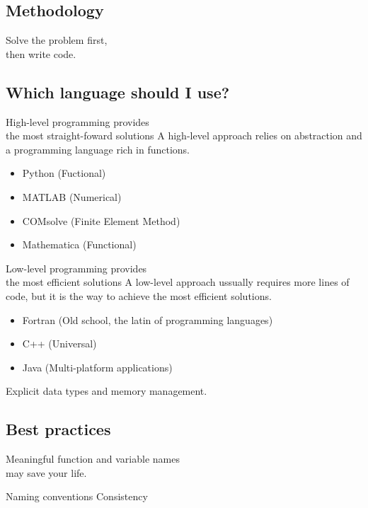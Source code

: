 \documentclass[xcolor={dvipsnames}]{beamer}
\begin{document}
\subsection{Methodology}

\begin{frame}{Solve the problem first,\\ then write code.}{}

\end{frame}

\subsection{Which language should I use?}

\begin{frame}{High-level programming provides\\ the most straight-foward solutions}{}
A high-level approach relies on abstraction and a programming language rich in functions.

\bigskip
\begin{itemize}
\item Python (Fuctional)
\item MATLAB (Numerical)
\item COMsolve (Finite Element Method)
\item Mathematica (Functional)
\end{itemize}
\end{frame}

\begin{frame}{Low-level programming provides\\ the most efficient solutions}{}
A low-level approach ussually requires more lines of code, but it is the way to achieve the most efficient solutions.

\bigskip
\begin{itemize}
\item Fortran (Old school, the latin of programming languages)
\item C++ (Universal)
\item Java (Multi-platform applications)
\end{itemize}

\bigskip
Explicit data types and memory management.
\end{frame}

\subsection{Best practices}
\begin{frame}{Meaningful function and variable names\\ may save your life.}{}

Naming conventions
Consistency


\end{frame}
\end{document}
